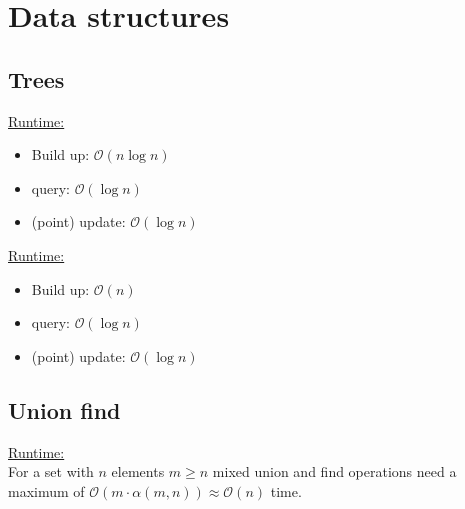 \section{Data structures}

\subsection{Trees}

\underline{Runtime:}
\begin{itemize}
\item Build up: $\mathcal{O}(n\log n)$
\item query: $\mathcal{O}(\log n)$
\item (point) update: $\mathcal{O}(\log n)$
\end{itemize}



\underline{Runtime:}
\begin{itemize}
\item Build up: $\mathcal{O}(n)$
\item query: $\mathcal{O}(\log n)$
\item (point) update: $\mathcal{O}(\log n)$
\end{itemize}


\subsection{Union find}
\underline{Runtime:}\\
For a set with $n$ elements $m \geq n$ mixed union and find operations need a maximum of $\mathcal{O}(m \cdot \alpha(m, n)) \approx \mathcal{O}(n)$ time.


